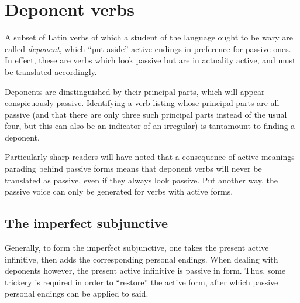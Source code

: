 \section{Deponent verbs}
A subset of Latin verbs of which a student of the language
ought to be wary are called \emph{deponent}, which ``put
aside'' active endings in preference for passive ones.  In
effect, these are verbs which look passive but are in
actuality active, and must be translated accordingly.

Deponents are dinstinguished by their principal parts,
which will appear conspicuously passive.  Identifying a
verb listing whose principal parts are all passive (and
that there are only three such principal parts instead of
the usual four, but this can also be an indicator of an
irregular) is tantamount to finding a deponent.

Particularly sharp readers will have noted that a
consequence of active meanings parading behind passive
forms means that deponent verbs will never be translated
as passive, even if they always look passive.  Put
another way, the passive voice can only be generated
for verbs with active forms.

%
%
%
%
%

\subsection{The imperfect subjunctive}
Generally, to form the imperfect subjunctive, one takes the
present active infinitive, then adds the corresponding
personal endings.  When dealing with deponents however, the
present active infinitive is passive in form.  Thus, some
trickery is required in order to ``restore'' the active
form, after which passive personal endings can be applied
to said.


